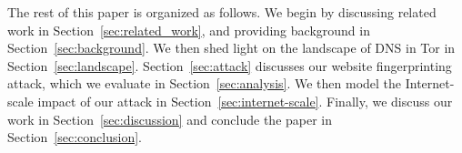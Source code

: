 The rest of this paper is organized as follows.  We begin by discussing related
work in Section~\ref{sec:related_work}, and providing background in
Section~\ref{sec:background}.  We then shed light on the landscape of DNS in Tor
in Section~\ref{sec:landscape}.  Section~\ref{sec:attack} discusses our website
fingerprinting attack, which we evaluate in Section~\ref{sec:analysis}.  We
then model the Internet-scale impact of our attack in
Section~\ref{sec:internet-scale}.  Finally, we discuss our work in
Section~\ref{sec:discussion} and conclude the paper in
Section~\ref{sec:conclusion}.
